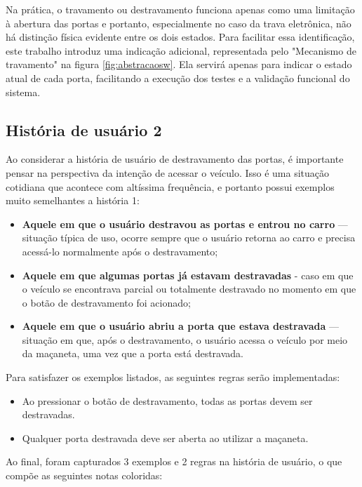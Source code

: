 Na prática, o travamento ou destravamento funciona apenas como uma limitação à abertura das portas e portanto, especialmente no caso da trava eletrônica, 
não há distinção física evidente entre os dois estados. Para facilitar essa identificação, este trabalho introduz uma indicação adicional, representada 
pelo "Mecanismo de travamento" na figura \ref{fig:abstracaosw}. Ela servirá apenas para indicar o estado atual de cada porta, facilitando a execução dos testes e a validação 
funcional do sistema.

\subsection{História de usuário 2}
\label{sbs:historia2}

Ao considerar a história de usuário de destravamento das portas, é importante pensar na perspectiva da intenção de acessar o veículo. Isso é uma situação 
cotidiana que acontece com altíssima frequência, e portanto possui exemplos muito semelhantes a história 1:

\begin{itemize}
    \item \textbf{Aquele em que o usuário destravou as portas e entrou no carro} — situação típica de uso, ocorre sempre que o usuário retorna ao carro e precisa acessá-lo normalmente após o destravamento;
    \item \textbf{Aquele em que algumas portas já estavam destravadas} - caso em que o veículo se encontrava parcial ou totalmente destravado no momento em que o botão de destravamento foi acionado;
    \item \textbf{Aquele em que o usuário abriu a porta que estava destravada} —  situação em que, após o destravamento, o usuário acessa o veículo por meio da maçaneta, uma vez que a porta está destravada.
\end{itemize}

Para satisfazer os exemplos listados, as seguintes regras serão implementadas:

\begin{itemize}
    \item Ao pressionar o botão de destravamento, todas as portas devem ser destravadas.
    \item Qualquer porta destravada deve ser aberta ao utilizar a maçaneta.
\end{itemize}

Ao final, foram capturados 3 exemplos e 2 regras na história de usuário, o que compõe as seguintes notas coloridas:

